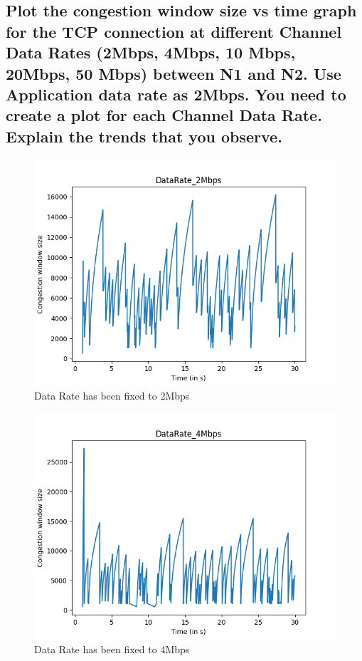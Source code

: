 \documentclass{article}
\begin{document}
\subsection{Plot the congestion window size vs time graph for the TCP connection at different
Channel Data Rates (2Mbps, 4Mbps, 10 Mbps, 20Mbps, 50 Mbps) between N1
and N2. Use Application data rate as 2Mbps. You need to create a plot for each
Channel Data Rate. Explain the trends that you observe.}

\begin{figure}[H]
    \centering
    \includegraphics[scale = 0.8]{Q2/outputs/plots/DataRate_2Mbps.png}
    \caption{Data Rate has been fixed to 2Mbps}
\end{figure}

\begin{figure}[H]
    \centering
    \includegraphics[scale = 0.8]{Q2/outputs/plots/DataRate_4Mbps.png}
    \caption{Data Rate has been fixed to 4Mbps}
\end{figure}
\end{document}
